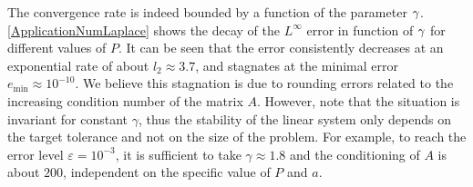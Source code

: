 \documentclass{article}
\begin{document}
\begin{Remark}
	The convergence rate is indeed bounded by a function of the parameter $\gamma$. \autoref{ApplicationNumLaplace} shows the decay of the $L^\infty$ error in function of $\gamma$ for different values of $P$. It can be seen that the error consistently decreases at an exponential rate of about $l_2 \approx 3.7$, and stagnates at the minimal error $e_{\min} \approx 10^{-10}$. We believe this stagnation is due to rounding errors related to the increasing condition number of the matrix $A$. However, note that the situation is invariant for constant $\gamma$, thus the stability of the linear system only depends on the target tolerance and not on the size of the problem. For example, to reach the error level $\varepsilon = 10^{-3}$, it is sufficient to take $\gamma \approx 1.8$ and the conditioning of $A$ is about $200$, independent on the specific value of $P$ and $a$.  
\end{Remark}
\end{document}
